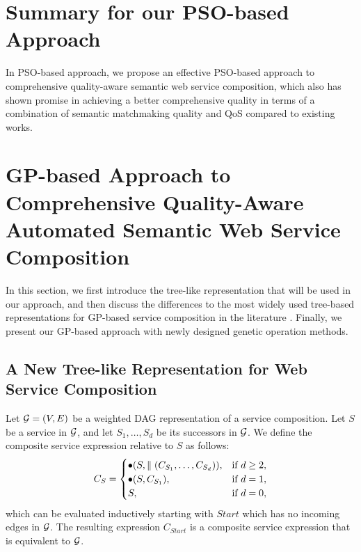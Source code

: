 \section{Summary for our PSO-based Approach}\label{summary1}

In PSO-based approach, we propose an effective PSO-based approach to comprehensive quality-aware semantic web service composition, which also has shown promise in achieving a better comprehensive quality in terms of a combination of semantic matchmaking quality and QoS compared to existing works.
\section{GP-based Approach to Comprehensive Quality-Aware Automated Semantic Web Service Composition}\label{GPApproach}

In this section, we first introduce the tree-like representation that will be used in our approach, and then discuss the differences to the most widely used tree-based representations for GP-based service composition in the literature \cite{gupta2015optimization,da2016genetic,yu2013adaptive}. Finally, we present our GP-based approach with newly designed genetic operation methods.
\subsection{A New Tree-like Representation for Web Service Composition}\label{representation} 

Let $\mathcal{G}=(V,E)$ be a weighted DAG representation of a service composition. Let $S$ be a service in $\mathcal{G}$, and let $S_1,\ldots,S_d$ be its successors in $\mathcal{G}$. We define the composite service expression relative to $S$ as follows: 
\begin{equation}
\label{eq_s_expression}
    C_S=
    \begin{cases}
      \bullet(S,\parallel(C_{S_1},\ldots,C_{S_d})), & \text{if $d\ge 2$}, \\
      \bullet(S,C_{S_1}), & \text{if $d=1$}, \\
      S, & \text{if $d=0$},
    \end{cases}
\end{equation}
which can be evaluated inductively starting with $Start$ which has no incoming edges in $\mathcal{G}$. The resulting expression $C_{Start}$ is a composite service expression that is equivalent to $\mathcal{G}$.

